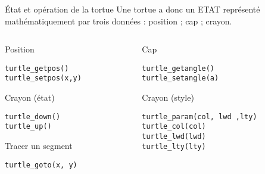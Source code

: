 \documentclass[10pt]{beamer}
\begin{document}
\begin{frame}[fragile]{État et opération de la tortue}
  Une tortue a donc un ETAT représenté mathématiquement par trois données : position ; cap ; crayon.


\begin{columns}[t]
\begin{column}{0.48\textwidth}
  \begin{block}{Position}
    \begin{lstlisting}[style=edblock]
turtle_getpos()
turtle_setpos(x,y)
\end{lstlisting}
  \end{block}

\begin{block}{Crayon (état)}
    \begin{lstlisting}[style=edblock]
turtle_down()
turtle_up()
\end{lstlisting}
\end{block}

\begin{alertblock}{Tracer un segment}
    \begin{lstlisting}[style=edblock]
turtle_goto(x, y)
\end{lstlisting}
\end{alertblock}

\end{column}
\begin{column}{0.48\textwidth}
  \begin{block}{Cap}
    \begin{lstlisting}[style=edblock]
turtle_getangle()
turtle_setangle(a)
    \end{lstlisting}
  \end{block}

\begin{block}{Crayon (style)}
    \begin{lstlisting}[style=edblock]
turtle_param(col, lwd ,lty)
turtle_col(col)
turtle_lwd(lwd)
turtle_lty(lty)
\end{lstlisting}
\end{block}
\end{column}
\end{columns}

\end{frame}
\end{document}
